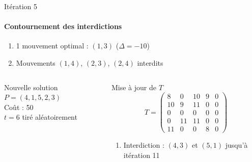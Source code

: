 \documentclass[10pt, handout]{beamer}
\begin{document}
\begin{frame}{Itération 5}
    \framesubtitle{Contournement des interdictions}


    \begin{enumerate}
        \item 1 mouvement optimal : \( (1,3) \) (\( \Delta = -10 \))
        \item Mouvements \( (1,4) \), \( (2,3) \), \( (2,4) \) interdits
    \end{enumerate}

    \begin{columns}
        \begin{alertblock}{Nouvelle solution}
            \( P = (4, 1, 5, 2, 3) \) \\
            Coût : 50 \\
            \( t = 6 \) tiré aléatoirement
        \end{alertblock}

        \begin{exampleblock}{Mise à jour de \( T \)}
            \[
                T = \begin{pmatrix}
                    8  & 0  & 10 & 9 & 0 \\
                    10 & 9  & 11 & 0 & 0 \\
                    0  & 0  & 0  & 0 & 0 \\
                    0  & 11 & 11 & 0 & 0 \\
                    11 & 0  & 0  & 8 & 0
                \end{pmatrix}
            \]
            \begin{enumerate}
                \item Interdiction : \( (4,3) \) et \( (5,1) \) jusqu'à itération 11
            \end{enumerate}
        \end{exampleblock}
    \end{columns}
\end{frame}
\end{document}
